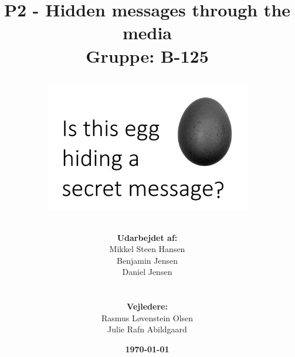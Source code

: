 \documentclass[11pt]{article}
\title{
    P2 - Hidden messages through the media 
    \\ 
    Gruppe: B-125
    \\
    \begin{figure}[!h]
        \centering
        \includegraphics[width=0.8\textwidth, angle =0]{Projectdoc/Assets/Illustrationer/egg-front.png}
        \label{fig:FrontPage}
    \end{figure}
}
\author{
    \textbf{Udarbejdet af:}\\
    Mikkel Steen Hansen\\
    Benjamin Jensen\\
    Daniel Jensen\\
    \\\\
    \textbf{Vejledere:}\\ 
    Rasmus Løvenstein Olsen\\
    Julie Rafn Abildgaard\\
}
\date{\textbf{\today}}
\renewcommand{\baselinestretch}{1.20}
\begin{document}
    \begin{titlepage}
        \clearpage
        \maketitle
        \thispagestyle{empty}
    \end{titlepage}
    
    
    
    \renewcommand{\baselinestretch}{0.8} 
    \tableofcontents
    \renewcommand{\baselinestretch}{1.20} 
    \newpage
    
    
    
    
    
    
    
    
    
    
    \newpage
    
    
    \newpage
    
    
    
    
    
    
    
    
    
    
    
    \newpage
    
    
    
    
    
\end{document}
